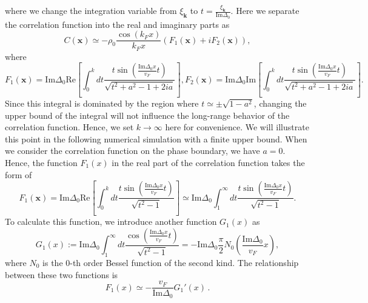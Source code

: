 \documentclass[aps,onecolumn,superscriptaddress,notitlepage,longbibliography]{revtex4-1}
\begin{document}
where we change the integration variable from $\xi_{\bm{k}}$ to $t=\frac{\xi_{\bm{k}}}{\text{Im}\Delta_0} $. Here we separate the correlation function into the real and imaginary parts as 
\begin{equation}
	C(\bm{x})\simeq-\rho_0 \frac{\cos(k_F x)}{k_Fx}(F_1(\bm{x})+iF_2(\bm{x})),
\end{equation}
where
\begin{equation}
	F_1(\bm{x})=\text{Im}\Delta_0\text{Re}\left[\int_0^{k} dt \frac{t\sin ( \frac{\text{Im}\Delta_0x}{v_F}
	t )}{ \sqrt{t^2 +a^2- 1+2ia}}\right],F_2(\bm{x})=\text{Im}\Delta_0\text{Im}\left[\int_0^{k} dt \frac{t\sin ( \frac{\text{Im}\Delta_0x}{v_F}
	t )}{ \sqrt{t^2 +a^2- 1+2ia}}\right]\label{F_1F_2}.
\end{equation}
 Since this integral is dominated by the region where $t\simeq\pm\sqrt{1-a^2}$, changing the upper bound of the integral will not influence the long-range behavior of the correlation function. Hence, we set $k\to\infty$ here for convenience. We will illustrate this point in the following numerical simulation with a finite upper bound.
 When we consider the correlation function on the phase boundary, we have $a=0$. Hence, the function $F_1(x)$ in the real part of the correlation function takes the form of
\begin{equation}
	F_1(\bm{x})=\text{Im}\Delta_0\text{Re}\left[\int_0^{k} dt \frac{t\sin ( \frac{\text{Im}\Delta_0x}{v_F}
	t )}{ \sqrt{t^2 - 1}}\right]\simeq\text{Im}\Delta_0\int_1^{\infty} dt \frac{t\sin ( \frac{\text{Im}\Delta_0x}{v_F}
	t )}{ \sqrt{t^2 - 1}}.
	\label{definition_of_F1}
\end{equation}
To calculate this function, we introduce another function $G_1(x)$ as
\begin{equation}
	G_1 (x) := \text{Im}
		\Delta_0\int_1^{\infty} dt \frac{\cos ( \frac{\text{Im}\Delta_0x}{v_F}
		t )}{ \sqrt{t^2 - 1}}=-\text{Im}\Delta_0\frac{\pi}{2} N_0 \left( \frac{\text{Im} \Delta_0}{v_F} x \right),
\end{equation}
where $N_0$ is the 0-th order Bessel function of the second kind. The relationship between these two functions is 
\begin{equation}
	F_1 (x) \simeq - \frac{v_F}{\text{Im}\Delta_0} G_1' (x)\,.
\end{equation}
\end{document}
